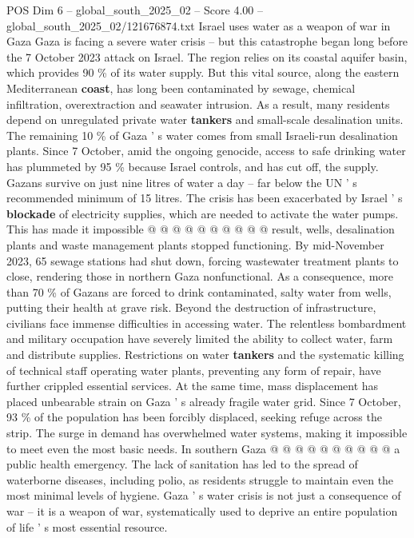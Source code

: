 \begin{textsample}{POS Dim 6 – global\_south\_2025\_02 – Score 4.00 – global\_south\_2025\_02/121676874.txt}  \label{ex:f6_pos_409}
Israel uses water as a weapon of war in Gaza Gaza is facing a severe water crisis -- but this catastrophe began long before the 7 October 2023 attack on Israel.
The region relies on its coastal aquifer basin, which provides 90 \% of its water supply.
But this vital source, along the eastern Mediterranean \textbf{coast}, has long been contaminated by sewage, chemical infiltration, overextraction and seawater intrusion.
As a result, many residents depend on unregulated private water \textbf{tankers} and small-scale desalination units.
The remaining 10 \% of Gaza ' s water comes from small Israeli-run desalination plants.
Since 7 October, amid the ongoing genocide, access to safe drinking water has plummeted by 95 \% because Israel controls, and has cut off, the supply.
Gazans survive on just nine litres of water a day -- far below the UN ' s recommended minimum of 15 litres.
The crisis has been exacerbated by Israel ' s \textbf{blockade} of electricity supplies, which are needed to activate the water pumps.
This has made it impossible @ @ @ @ @ @ @ @ @ @ result, wells, desalination plants and waste management plants stopped functioning.
By mid-November 2023, 65 sewage stations had shut down, forcing wastewater treatment plants to close, rendering those in northern Gaza nonfunctional.
As a consequence, more than 70 \% of Gazans are forced to drink contaminated, salty water from wells, putting their health at grave risk.
Beyond the destruction of infrastructure, civilians face immense difficulties in accessing water.
The relentless bombardment and military occupation have severely limited the ability to collect water, farm and distribute supplies.
Restrictions on water \textbf{tankers} and the systematic killing of technical staff operating water plants, preventing any form of repair, have further crippled essential services.
At the same time, mass displacement has placed unbearable strain on Gaza ' s already fragile water grid.
Since 7 October, 93 \% of the population has been forcibly displaced, seeking refuge across the strip.
The surge in demand has overwhelmed water systems, making it impossible to meet even the most basic needs.
In southern Gaza @ @ @ @ @ @ @ @ @ @ a public health emergency.
The lack of sanitation has led to the spread of waterborne diseases, including polio, as residents struggle to maintain even the most minimal levels of hygiene.
Gaza ' s water crisis is not just a consequence of war -- it is a weapon of war, systematically used to deprive an entire population of life ' s most essential resource.

\end{textsample}

